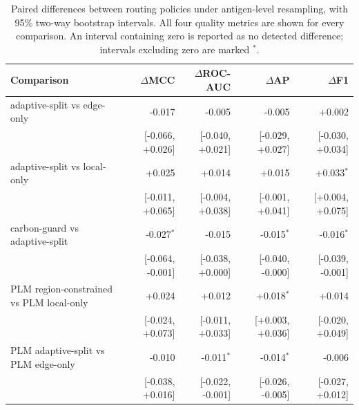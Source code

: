 \begin{table}[t]
\centering
\caption{Paired differences between routing policies under antigen-level resampling, with 95\% two-way bootstrap intervals. All four quality metrics are shown for every comparison. An interval containing zero is reported as no detected difference; intervals excluding zero are marked $^{\ast}$.}
\label{tab:paired}
\small
\setlength{\tabcolsep}{4pt}
\begin{tabular}{@{}lrrrr@{}}
\toprule
Comparison & $\Delta$MCC & $\Delta$ROC-AUC & $\Delta$AP & $\Delta$F1 \\
\midrule
adaptive-split vs edge-only & -0.017 & -0.005 & -0.005 & +0.002 \\
 & \tiny[-0.066, +0.026] & \tiny[-0.040, +0.021] & \tiny[-0.029, +0.027] & \tiny[-0.030, +0.034] \\
\addlinespace
adaptive-split vs local-only & +0.025 & +0.014 & +0.015 & +0.033$^{\ast}$ \\
 & \tiny[-0.011, +0.065] & \tiny[-0.004, +0.038] & \tiny[-0.001, +0.041] & \tiny[+0.004, +0.075] \\
\addlinespace
carbon-guard vs adaptive-split & -0.027$^{\ast}$ & -0.015 & -0.015$^{\ast}$ & -0.016$^{\ast}$ \\
 & \tiny[-0.064, -0.001] & \tiny[-0.038, +0.000] & \tiny[-0.040, -0.000] & \tiny[-0.039, -0.001] \\
\addlinespace
PLM region-constrained vs PLM local-only & +0.024 & +0.012 & +0.018$^{\ast}$ & +0.014 \\
 & \tiny[-0.024, +0.073] & \tiny[-0.011, +0.033] & \tiny[+0.003, +0.036] & \tiny[-0.020, +0.049] \\
\addlinespace
PLM adaptive-split vs PLM edge-only & -0.010 & -0.011$^{\ast}$ & -0.014$^{\ast}$ & -0.006 \\
 & \tiny[-0.038, +0.016] & \tiny[-0.022, -0.001] & \tiny[-0.026, -0.005] & \tiny[-0.027, +0.012] \\
\bottomrule
\end{tabular}
\end{table}
